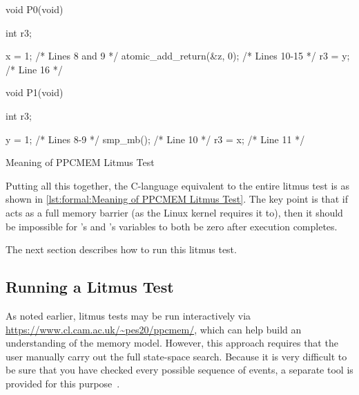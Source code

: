 \QuickQuizEnd

\begin{listing}
\begin{VerbatimL}
void P0(void)
{
	int r3;

	x = 1; /* Lines 8 and 9 */
	atomic_add_return(&z, 0); /* Lines 10-15 */
	r3 = y; /* Line 16 */
}

void P1(void)
{
	int r3;

	y = 1; /* Lines 8-9 */
	smp_mb(); /* Line 10 */
	r3 = x; /* Line 11 */
}
\end{VerbatimL}
\caption{Meaning of PPCMEM Litmus Test}
\label{lst:formal:Meaning of PPCMEM Litmus Test}
\end{listing}

Putting all this together, the C-language equivalent to the entire litmus
test is as shown in
\cref{lst:formal:Meaning of PPCMEM Litmus Test}.
The key point is that if  acts as a full
memory barrier (as the Linux kernel requires it to), 
then it should be impossible for 's and 's 
variables to both be zero after execution completes.

The next section describes how to run this litmus test.

\subsection{Running a Litmus Test}
\label{sec:formal:Running a Litmus Test}

As noted earlier, litmus tests may be run interactively via
\url{https://www.cl.cam.ac.uk/~pes20/ppcmem/}, which can help build an
understanding of the memory model.
However, this approach requires that the user manually carry out the
full state-space search.
Because it is very difficult to be sure that you have checked every
possible sequence of events, a separate tool is provided for this
purpose~\cite{PaulEMcKenney2011ppcmem}.

